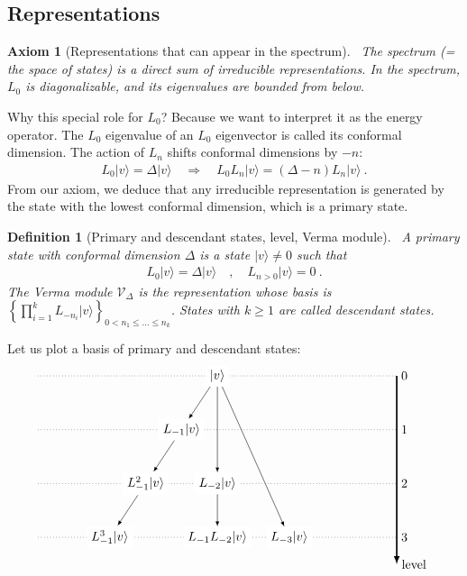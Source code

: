 \documentclass[12pt, a4paper]{article}
\theoremstyle{break}
\newtheorem{hyp}[exo]{Axiom}
\newtheorem{defn}[exo]{Definition}
\begin{document}
\subsection{Representations}

\begin{hyp}[Representations that can appear in the spectrum]
 ~\label{hyp:rep}
 The spectrum (= the space of states) is a direct sum of irreducible representations. In the spectrum, $L_0$ is diagonalizable, and its eigenvalues are bounded from below.
\end{hyp}
Why this special role for $L_0$? Because we want to interpret it as the energy operator. 
The $L_0$ eigenvalue of an $L_0$ eigenvector is called its conformal dimension. The action of $L_n$ shifts conformal dimensions by $-n$:
\begin{align}
 L_0|v\rangle = \Delta|v\rangle \quad \Rightarrow\quad  
 L_0 L_n|v\rangle 
 = (\Delta-n)L_n|v\rangle \ .
\end{align}
From our axiom, we deduce that any irreducible representation is generated by the state with the lowest conformal dimension, which is a primary state.

\begin{defn}[Primary and descendant states, level, Verma module]
 ~\label{def:prim}
 A primary state with conformal dimension $\Delta$ is a state $|v\rangle\neq 0$ such that 
 \begin{align}
  L_0 |v\rangle = \Delta |v\rangle \quad , \quad L_{n>0} |v\rangle = 0\ .
 \end{align}
The Verma module $\mathcal V_\Delta$ is the representation whose basis is 
 $
 \left\{ \prod_{i=1}^k L_{-n_i} |v\rangle\right\}_{ 0<n_1\leq \dots \leq n_k}
 $.
 States with $k\geq 1$ are called descendant states. 
\end{defn}
Let us plot a basis of primary and descendant states:
\begin{align}
 \begin{tikzpicture}[scale = .25, baseline=(current  bounding  box.center)]
  \draw[-latex, very thick] (20, 0) -- (20, -21) node [right] {level};
  \foreach \x in {0, ..., 3}
  {
  \draw [dotted] (-20, {-6*\x}) -- (20, {-6*\x}) node [right] {${\x}$};
  }
  \node[fill = white] at (0, 0) (0) {$|v\rangle$};
  \node[fill = white] at (-4,-6) (1) {$L_{-1}|v\rangle$};
  \node[fill = white] at (-8, -12) (11) {$L_{-1}^2|v\rangle$};
  \node[fill = white] at (-12, -18) (111) {$L_{-1}^3|v\rangle$};
  \node[fill = white] at (0,-12) (2) {$L_{-2}|v\rangle$};
  \node[fill = white] at (0,-18) (12) {$L_{-1}L_{-2}|v\rangle$};
  \node[fill = white] at (8,-18) (3) {$L_{-3}|v\rangle$};
  \draw[-latex] (0) -- (1);
  \draw[-latex] (1) -- (11);
  \draw[-latex] (11) -- (111);
  \draw[-latex] (0) -- (2);
  \draw[-latex] (0) -- (3);
  \draw[-latex] (2) -- (12);
 \end{tikzpicture}
\end{align}
\end{document}

